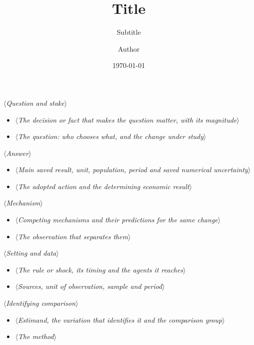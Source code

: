 \documentclass[unicode, t, 12pt, aspectratio=169, unknownkeysallowed]{beamer}
\title{Title}
\subtitle{Subtitle}
\author{Author}
\institute{University}
\date{\today}
\providecommand{\slot}[1]{{\color{gray}\itshape\ensuremath{\langle}#1\ensuremath{\rangle}}}
\begin{document}
\begin{frame}[plain,b]
 \titlepage
\end{frame}

\begin{frame}{\slot{Question and stake}}
    \begin{itemize}
        \item \slot{The decision or fact that makes the question matter, with its magnitude}
        \item \slot{The question: who chooses what, and the change under study}
    \end{itemize}
\end{frame}

\begin{frame}{\slot{Answer}}
    \begin{itemize}
        \item \slot{Main saved result, unit, population, period and saved numerical uncertainty}
        \item \slot{The adopted action and the determining economic result}
    \end{itemize}
\end{frame}

\begin{frame}{\slot{Mechanism}}
    \begin{itemize}
        \item \slot{Competing mechanisms and their predictions for the same change}
        \item \slot{The observation that separates them}
    \end{itemize}
\end{frame}

\begin{frame}{\slot{Setting and data}}
    \begin{itemize}
        \item \slot{The rule or shock, its timing and the agents it reaches}
        \item \slot{Sources, unit of observation, sample and period}
    \end{itemize}
\end{frame}

\begin{frame}{\slot{Identifying comparison}}
    \begin{itemize}
        \item \slot{Estimand, the variation that identifies it and the comparison group}
        \item \slot{The method}
    \end{itemize}
\end{frame}
\end{document}
